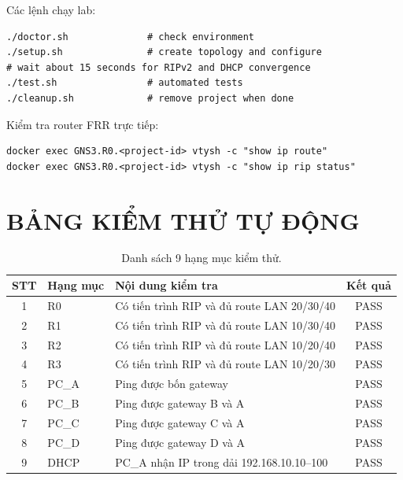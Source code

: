 \documentclass[12pt,a4paper]{article}
\begin{document}
Các lệnh chạy lab:

\begin{lstlisting}[style=plaincode,caption={Quy trình chạy lab.}]
./doctor.sh              # check environment
./setup.sh               # create topology and configure
# wait about 15 seconds for RIPv2 and DHCP convergence
./test.sh                # automated tests
./cleanup.sh             # remove project when done
\end{lstlisting}

Kiểm tra router FRR trực tiếp:

\begin{lstlisting}[style=plaincode,caption={Kiểm tra router qua \texttt{docker exec}.}]
docker exec GNS3.R0.<project-id> vtysh -c "show ip route"
docker exec GNS3.R0.<project-id> vtysh -c "show ip rip status"
\end{lstlisting}

\section{BẢNG KIỂM THỬ TỰ ĐỘNG}
\label{app:tests}

\begin{table}[H]
  \centering
  \caption{Danh sách 9 hạng mục kiểm thử.}
  \label{tab:testmatrix}
  \begin{tabularx}{\textwidth}{@{}c l X c@{}}
    \toprule
    \textbf{STT} & \textbf{Hạng mục} & \textbf{Nội dung kiểm tra} & \textbf{Kết quả} \\
    \midrule
    1 & R0 & Có tiến trình RIP và đủ route LAN 20/30/40 & PASS \\
    2 & R1 & Có tiến trình RIP và đủ route LAN 10/30/40 & PASS \\
    3 & R2 & Có tiến trình RIP và đủ route LAN 10/20/40 & PASS \\
    4 & R3 & Có tiến trình RIP và đủ route LAN 10/20/30 & PASS \\
    5 & PC\_A & Ping được bốn gateway & PASS \\
    6 & PC\_B & Ping được gateway B và A & PASS \\
    7 & PC\_C & Ping được gateway C và A & PASS \\
    8 & PC\_D & Ping được gateway D và A & PASS \\
    9 & DHCP & PC\_A nhận IP trong dải 192.168.10.10--100 & PASS \\
    \bottomrule
  \end{tabularx}
\end{table}
\end{document}
